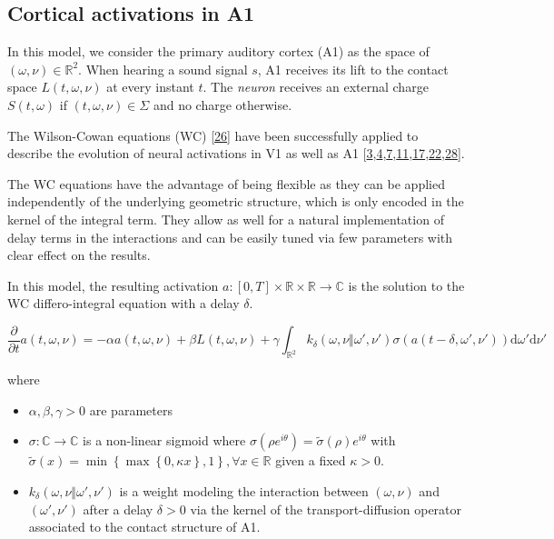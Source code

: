 \documentclass[american,]{article}
\providecommand{\tightlist}{%
  \setlength{\itemsep}{0pt}\setlength{\parskip}{0pt}}
\theoremstyle{definition}
\theoremstyle{definition}
\theoremstyle{definition}
\theoremstyle{remark}
\begin{document}
\hypertarget{cortical-activations-in-a1}{%
\subsection{Cortical activations in A1}\label{cortical-activations-in-a1}}

In this model, we consider the primary auditory cortex (A1) as the space of \((\omega,\nu)\in\mathbb{R}^2\).
When hearing a sound signal \(s\), A1 receives its lift to the contact space \(L(t,\omega,\nu)\)
at every instant \(t\).
The \emph{neuron} receives an external charge \(S(t,\omega)\) if \((t,\omega,\nu)\in\Sigma\) and no charge otherwise.

The Wilson-Cowan equations (WC) {[}\protect\hyperlink{ref-wilson1972}{26}{]} have been successfully applied to describe
the evolution of neural activations in V1 as well as A1
{[}\protect\hyperlink{ref-bertalmio2018}{3},\protect\hyperlink{ref-boscain2017}{4},\protect\hyperlink{ref-bressloff2002a}{7},\protect\hyperlink{ref-ermentrout1979}{11},\protect\hyperlink{ref-loebel2007}{17},\protect\hyperlink{ref-rankin2015}{22},\protect\hyperlink{ref-zulfiqar2019}{28}{]}.

The WC equations have the advantage of being flexible as they can be applied independently
of the underlying geometric structure, which is only encoded in the kernel of the integral term.
They allow as well for a natural implementation of delay terms in the interactions
and can be easily tuned via few parameters with clear effect on the results.

In this model, the resulting activation \(a:[0,T]\times\mathbb{R}\times\mathbb{R}\rightarrow\mathbb{C}\) is the solution
to the WC differo-integral equation with a delay \(\delta\).

\begin{equation}
\frac{\partial}{\partial t}a(t,\omega,\nu) = -\alpha a(t,\omega,\nu) + \beta L(t,\omega,\nu)
+ \gamma\int_{\mathbb{R}^2} k_\delta(\omega,\nu\Vert\omega',\nu') \sigma(a(t-\delta,\omega',\nu')) \mathrm{d}\omega'\mathrm{d}\nu'
\end{equation}

where

\begin{itemize}
\tightlist
\item
  \(\alpha,\beta,\gamma>0\) are parameters
\item
  \(\sigma:\mathbb{C}\rightarrow\mathbb{C}\) is a non-linear sigmoid where \(\sigma(\rho e^{i\theta})=\tilde\sigma(\rho)e^{i\theta}\)
  with \(\tilde\sigma(x)=\min\left\{\max\left\{0,\kappa x\right\}, 1\right\},\forall x\in\mathbb{R}\) given a fixed \(\kappa>0\).
\item
  \(k_\delta(\omega,\nu\Vert\omega',\nu')\) is a weight modeling the interaction
  between \((\omega,\nu)\) and \((\omega',\nu')\) after a delay \(\delta>0\) via the kernel of the transport-diffusion
  operator associated to the contact structure of A1.
\end{itemize}
\end{document}
